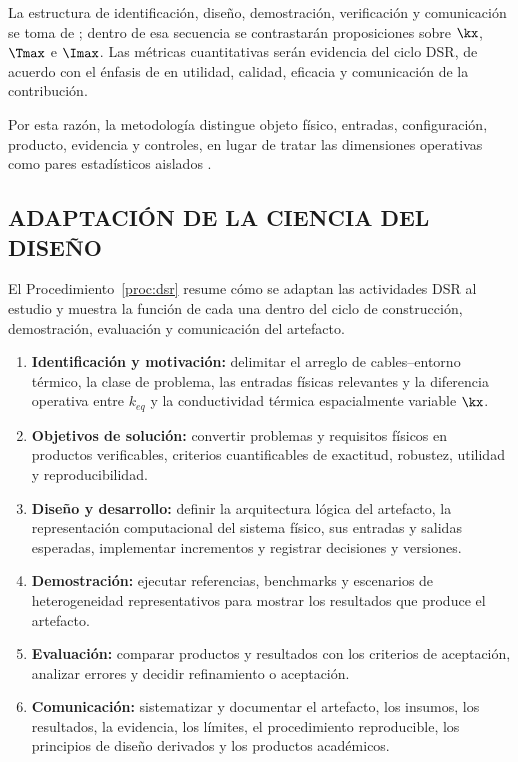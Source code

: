 La estructura de identificación, diseño, demostración, verificación y comunicación se toma de \textcite[55--56]{peffers2007}; dentro de esa secuencia se contrastarán proposiciones sobre $\kx$, $\Tmax$ e $\Imax$. Las métricas cuantitativas serán evidencia del ciclo DSR, de acuerdo con el énfasis de \textcite[349--351]{gregor2013} en utilidad, calidad, eficacia y comunicación de la contribución.

Por esta razón, la metodología distingue objeto físico, entradas, configuración, producto, evidencia y controles, en lugar de tratar las dimensiones operativas como pares estadísticos aislados \parencites[55--56]{peffers2007}[342--344]{gregor2013}.





\subsection{ADAPTACIÓN DE LA CIENCIA DEL DISEÑO}

El Procedimiento~\ref{proc:dsr} resume cómo se adaptan las actividades DSR al estudio y muestra la función de cada una dentro del ciclo de construcción, demostración, evaluación y comunicación del artefacto.

\begin{procedure}[htbp]
\caption{Proceso DSR adaptado al estudio. Fuente: Elaboración propia.}
\label{proc:dsr}
\begin{enumerate}[label=\textbf{A\arabic*.}]
  \item \textbf{Identificación y motivación:} delimitar el arreglo de cables--entorno térmico, la clase de problema, las entradas físicas relevantes y la diferencia operativa entre $k_{eq}$ y la conductividad térmica espacialmente variable $\kx$.
  \item \textbf{Objetivos de solución:} convertir problemas y requisitos físicos en productos verificables, criterios cuantificables de exactitud, robustez, utilidad y reproducibilidad.
  \item \textbf{Diseño y desarrollo:} definir la arquitectura lógica del artefacto, la representación computacional del sistema físico, sus entradas y salidas esperadas, implementar incrementos y registrar decisiones y versiones.
  \item \textbf{Demostración:} ejecutar referencias, benchmarks y escenarios de heterogeneidad representativos para mostrar los resultados que produce el artefacto.
  \item \textbf{Evaluación:} comparar productos y resultados con los criterios de aceptación, analizar errores y decidir refinamiento o aceptación.
  \item \textbf{Comunicación:} sistematizar y documentar el artefacto, los insumos, los resultados, la evidencia, los límites, el procedimiento reproducible, los principios de diseño derivados y los productos académicos.
\end{enumerate}
\end{procedure}

